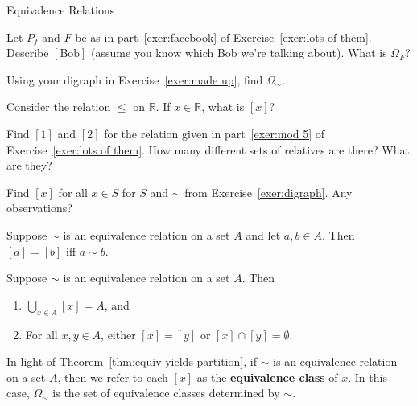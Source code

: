 \begin{section}{Equivalence Relations}
\begin{exercise}
Let $P_f$ and $F$ be as in part~\ref{exer:facebook} of Exercise~\ref{exer:lots of them}.  Describe $[\text{Bob}]$ (assume you know which Bob we're talking about).  What is $\Omega_F$?
\end{exercise}

\begin{exercise}
Using your digraph in Exercise~\ref{exer:made up}, find $\Omega_{\sim}$.  
\end{exercise}

\begin{exercise}
Consider the relation $\leq$ on $\mathbb{R}$.  If $x\in \mathbb{R}$, what is $[x]$?
\end{exercise}

\begin{exercise}\label{exer:mod5classes}
Find $[1]$ and $[2]$ for the relation given in part~\ref{exer:mod 5} of Exercise~\ref{exer:lots of them}.  How many different sets of relatives are there?  What are they?
\end{exercise}

\begin{exercise}
Find $[x]$ for all $x\in S$ for $S$ and $\sim$ from Exercise~\ref{exer:digraph}.  Any observations?
\end{exercise}

\begin{theorem}\label{thm:related iff same class}
Suppose $\sim$ is an equivalence relation on a set $A$ and let $a,b\in A$.  Then $[a]=[b]$ iff $a\sim b$.
\end{theorem}

\begin{theorem}\label{thm:equiv yields partition}
Suppose $\sim$ is an equivalence relation on a set $A$.  Then
\begin{enumerate}[label=\textrm{(\alph*)}]
\item $\bigcup_{x\in A}[x]=A$, and
\item For all $x,y\in A$, either $[x]=[y]$ or $[x]\cap [y]=\emptyset$.
\end{enumerate}
\end{theorem}

\begin{definition}
In light of Theorem~\ref{thm:equiv yields partition}, if $\sim$ is an equivalence relation on a set $A$, then we refer to each $[x]$ as the \textbf{equivalence class} of $x$.  In this case, $\Omega_{\sim}$ is the set of equivalence classes determined by $\sim$.
\end{definition}


\end{section}
